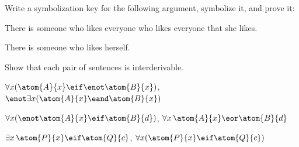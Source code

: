 \solutions
\problempart
\label{pr.likes}
Write a symbolization key for the following argument, symbolize it, and prove it:
\begin{earg}
\item There is someone who likes everyone who likes everyone that she
likes. 
\item[\texttherefore] There is someone who likes herself.
\end{earg}

\problempart
Show that each pair of sentences is interderivable.
\begin{compactlist}
\item $\forall x (\atom{A}{x}\eif \enot \atom{B}{x})$, $\enot\exists x(\atom{A}{x} \eand \atom{B}{x})$
\item $\forall x (\enot \atom{A}{x}\eif \atom{B}{d})$, $\forall x\,\atom{A}{x} \eor \atom{B}{d}$
\item $\exists x\,\atom{P}{x} \eif \atom{Q}{c}$, $\forall x (\atom{P}{x} \eif \atom{Q}{c})$
\end{compactlist}


